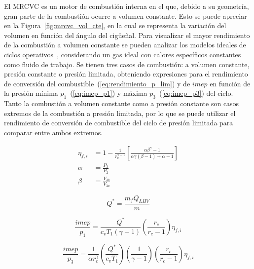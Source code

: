 El MRCVC es un motor de combustión interna en el que, debido a su geometría,
gran parte de la combustión ocurre a volumen constante.
%
Esto se puede apreciar en la Figura~\ref{fig:mrcvc_vol_cte}, en la cual se
representa la variación del volumen en función del ángulo del cigüeñal.
%
Para visualizar el mayor rendimiento de la combustión a volumen constante  se
pueden analizar los modelos ideales de ciclos operativos~\parencite{heywood},
considerando un gas ideal con calores específicos constantes como fluido de
trabajo.
%
Se tienen tres casos de combustión: a volumen constante, presión constante o presión
limitada, obteniendo expresiones para el rendimiento de conversión del
combustible~(\ref{eq:rendimiento_p_lim}) y de $imep$ en función de la presión
mínima $p_1$~(\ref{eq:imep_p1}) y máxima $p_3$~(\ref{eq:imep_p3}) del ciclo.
%
Tanto la combustión a volumen constante como a presión constante son casos
extremos de la combustión a presión limitada, por lo que se puede utilizar el
rendimiento de conversión de combustible del ciclo de presión limitada para
comparar entre ambos extremos.


\begin{align}
    \label{eq:rendimiento_p_lim}
  \eta_{f,i} &= 1 - \frac{1}{r_c^{\gamma - 1}} \left[ \frac{\alpha \beta^\gamma-1}{\alpha \gamma (\beta-1)+\alpha-1} \right]\\
  \alpha &= \frac{P_3}{P_2}\\ \beta &= \frac{V_{3b}}{V_{3a}}
\end{align}


\begin{equation}
    \label{eq:Q*} Q^{*}=  \frac{m_{f}Q_{LHV}}{m}
\end{equation}



\begin{equation}
    \label{eq:imep_p1} \frac{imep}{p_1} = \frac{Q^*}{c_v T_1 (\gamma-1)} \left( \frac{r_c}{r_c-1} \right) \eta_{f,i}
\end{equation}

\begin{equation}
    \label{eq:imep_p3} \frac{imep}{p_3} = \frac{1}{\alpha r_c^\gamma} \left( \frac{Q^*}{c_v T_1} \right) \left(\frac{1}{\gamma-1} \right) \left( \frac{r_c}{r_c-1} \right) \eta_{f,i}
\end{equation}


